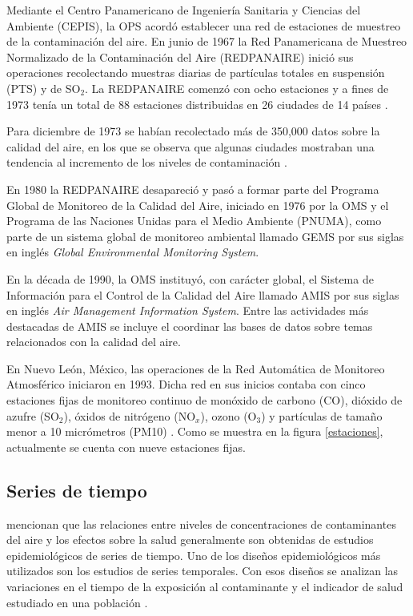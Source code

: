 \documentclass[3p,times]{elsarticle}
\begin{document}
Mediante el Centro Panamericano de Ingeniería Sanitaria y Ciencias del Ambiente (CEPIS), la OPS acordó establecer una red de estaciones de muestreo de la contaminación del aire.
En junio de 1967 la Red Panamericana de Muestreo Normalizado de la Contaminación del Aire (REDPANAIRE) inició sus operaciones recolectando muestras diarias de partículas totales en suspensión (PTS) y de SO$_2$. La REDPANAIRE comenzó con ocho estaciones y a fines de 1973 tenía un total de 88 estaciones distribuidas en 26 ciudades de 14 países \citep{r5}.

Para diciembre de 1973 se habían recolectado más de 350,000 datos sobre la calidad del aire, en los que se observa que algunas ciudades mostraban una tendencia al incremento de los niveles de contaminación \citep{r5}.

En 1980 la REDPANAIRE desapareció y pasó a formar parte del Programa Global de Monitoreo de la Calidad del Aire, iniciado en 1976 por la OMS y el Programa de las Naciones Unidas para el Medio Ambiente (PNUMA), como parte de un sistema global de monitoreo ambiental llamado GEMS por sus siglas en inglés \emph{Global Environmental Monitoring System}.

En la década de 1990, la OMS instituyó, con carácter global, el Sistema de Información para el Control de la Calidad del Aire llamado AMIS por sus siglas en inglés \emph{Air Management Information System}. Entre las actividades más destacadas de AMIS se incluye el coordinar las bases de datos sobre temas relacionados con la calidad del aire.

En Nuevo León, México, las operaciones de la Red Automática de Monitoreo Atmosférico iniciaron en 1993. Dicha red en sus inicios contaba con cinco estaciones fijas de monitoreo continuo de monóxido de carbono (CO), dióxido de azufre (SO$_2$), óxidos de nitrógeno (NO$_x$), ozono (O$_3$) y partículas de tamaño menor a 10 micrómetros (PM10) \citep{r4}. Como se muestra en la figura \ref{estaciones}, actualmente se cuenta con nueve estaciones fijas.

\subsection{Series de tiempo}
\citet{r4} mencionan que las relaciones entre niveles de concentraciones de contaminantes del aire y los efectos sobre la salud generalmente son obtenidas de estudios epidemiológicos de series de tiempo. Uno de los diseños epidemiológicos más utilizados son los estudios de series temporales. Con esos diseños se analizan las variaciones en el tiempo de la exposición al contaminante y el indicador de salud estudiado en una población \citep{r1}.
\end{document}
